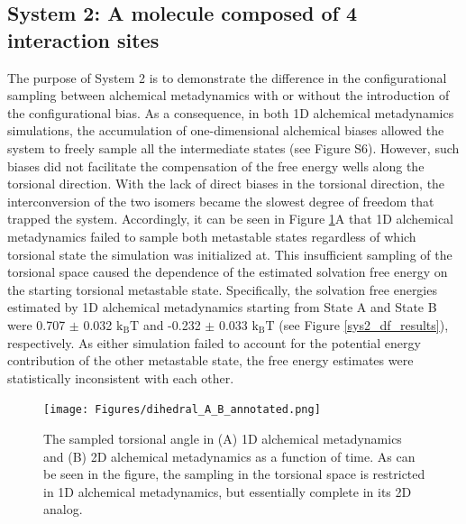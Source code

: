 \documentclass[journal=jacsat,manuscript=article]{achemso}
\begin{document}
\subsection{System 2: A molecule composed of 4 interaction sites}
The purpose of System 2 is to demonstrate the difference in the configurational sampling between alchemical metadynamics with or without the introduction of the configurational bias. As a consequence, in both 1D alchemical metadynamics simulations, the accumulation of one-dimensional alchemical biases allowed the system to freely sample all the intermediate states (see Figure S6). However, such biases did not facilitate the compensation of the free energy wells along the torsional direction. With the lack of direct biases in the torsional direction, the interconversion of the two isomers became the slowest degree of freedom that trapped the system. Accordingly, it can be seen in Figure \ref{dihedral_A_B}A that 1D alchemical metadynamics failed to sample both metastable states regardless of which torsional state the simulation was initialized at. This insufficient sampling of the torsional space caused the dependence of the estimated solvation free energy on the starting torsional metastable state. Specifically, the solvation free energies estimated by 1D alchemical metadynamics starting from State A and State B were 0.707 $\pm$ 0.032 $\text{k}_{\text{B}}\text{T}$ and -0.232 $\pm$ 0.033 $\text{k}_{\text{B}}\text{T}$ (see Figure \ref{sys2_df_results}), respectively. As either simulation 
failed to account for the potential energy contribution of the other metastable state, the free energy estimates were statistically inconsistent with each other. 

\begin{figure}[ht]
    \centering
    \texttt{[image: Figures/dihedral\_A\_B\_annotated.png]}   
    \caption{The sampled torsional angle in (A) 1D alchemical metadynamics and (B) 2D alchemical metadynamics as a function of time. As can be seen in the figure, the sampling in the torsional space is restricted in 1D alchemical metadynamics, but essentially complete in its 2D analog.}
    \label{dihedral_A_B}
\end{figure}
\end{document}
